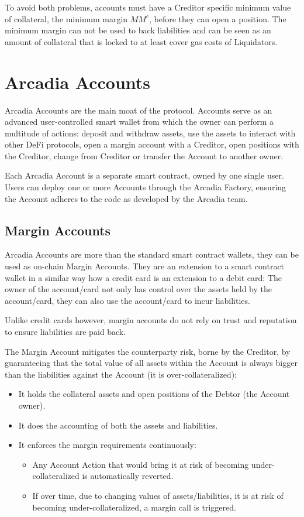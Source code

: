 \documentclass[sigconf,nonacm]{acmart}
\begin{document}
To avoid both problems, accounts must have a Creditor specific minimum value of collateral, the minimum margin $MM^{c}$, before they can open a position.
The minimum margin can not be used to back liabilities and can be seen as an amount of collateral that is locked to at least cover gas costs of Liquidators.

\section{Arcadia Accounts}
\label{sec:arcadia-accounts}
Arcadia Accounts are the main moat of the protocol.
Accounts serve as an advanced user-controlled smart wallet from which the owner can perform a multitude of actions: deposit and withdraw assets,
use the assets to interact with other DeFi protocols, open a margin account with a Creditor, open positions with the Creditor,
change from Creditor or transfer the Account to another owner.

Each Arcadia Account is a separate smart contract, owned by one single user.
Users can deploy one or more Accounts through the Arcadia Factory, ensuring the Account adheres to the code as developed by the Arcadia team.

\subsection{Margin Accounts}
\label{subsec:margin-accounts}
Arcadia Accounts are more than the standard smart contract wallets, they can be used as on-chain Margin Accounts.
They are an extension to a smart contract wallet in a similar way how a credit card is an extension to a debit card:
The owner of the account/card not only has control over the assets held by the account/card,
they can also use the account/card to incur liabilities.

Unlike credit cards however, margin accounts do not rely on trust and reputation to ensure liabilities are paid back.

The Margin Account mitigates the counterparty risk, borne by the Creditor,
by guaranteeing that the total value of all assets within the Account is always bigger than the liabilities against the Account (it is over-collateralized):
\begin{itemize}
    \item It holds the collateral assets and open positions of the Debtor (the Account owner).
    \item It does the accounting of both the assets and liabilities.
    \item It enforces the margin requirements continuously:
    \begin{itemize}
        \item Any Account Action that would bring it at risk of becoming under-collateralized is automatically reverted.
        \item If over time, due to changing values of assets/liabilities, it is at risk of becoming under-collateralized, a margin call is triggered.
    \end{itemize}
\end{itemize}
\end{document}
